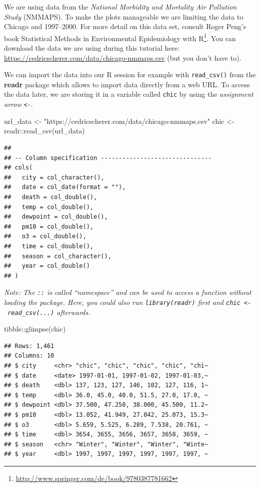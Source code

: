 \documentclass[
]{krantz}
\makeatletter
\newenvironment{Shaded}{\begin{snugshade}}{\end{snugshade}}
\newcommand{\FunctionTok}[1]{\textcolor[rgb]{0,0,0}{#1}}
\newcommand{\NormalTok}[1]{#1}
\newcommand{\OtherTok}[1]{\textcolor[rgb]{0.37,0.37,0.37}{#1}}
\newcommand{\SpecialCharTok}[1]{\textcolor[rgb]{0,0,0}{#1}}
\newcommand{\StringTok}[1]{\textcolor[rgb]{0.5,0.5,0.5}{#1}}
\renewcommand{\href}[2]{#2\footnote{\url{#1}}}
\newenvironment{kframe}{%
\medskip{}
\setlength{\fboxsep}{.8em}
 \def\at@end@of@kframe{}%
 \ifinner\ifhmode%
  \def\at@end@of@kframe{\end{minipage}}%
  \begin{minipage}{\columnwidth}%
 \fi\fi%
 \def\FrameCommand##1{\hskip\@totalleftmargin \hskip-\fboxsep
 \colorbox{shadecolor}{##1}\hskip-\fboxsep
     \hskip-\linewidth \hskip-\@totalleftmargin \hskip\columnwidth}%
 \MakeFramed {\advance\hsize-\width
   \@totalleftmargin\z@ \linewidth\hsize
   \@setminipage}}%
 {\par\unskip\endMakeFramed%
 \at@end@of@kframe}
\renewenvironment{Shaded}{\begin{kframe}}{\end{kframe}}
\makeatother
\begin{document}
We are using data from the \emph{National Morbidity and Mortality Air Pollution Study} (NMMAPS). To make the plots manageable we are limiting the data to Chicago and 1997--2000. For more detail on this data set, consult Roger Peng's book \href{http://www.springer.com/de/book/9780387781662}{Statistical Methods in Environmental Epidemiology with R}.
You can download the data we are using during this tutorial here: \url{https://cedricscherer.com/data/chicago-nmmaps.csv} (but you don't have to).

We can import the data into our R session for example with \texttt{read\_csv()} from the \textbf{readr} package which allows to import data directly from a web URL. To access the data later, we are storing it in a variable called \texttt{chic} by using the \emph{assignment arrow} \texttt{\textless{}-}.

\begin{Shaded}
\begin{Highlighting}[]
\NormalTok{url\_data }\OtherTok{\textless{}{-}} \StringTok{"https://cedricscherer.com/data/chicago{-}nmmaps.csv"}
\NormalTok{chic }\OtherTok{\textless{}{-}}\NormalTok{ readr}\SpecialCharTok{::}\FunctionTok{read\_csv}\NormalTok{(url\_data)}
\end{Highlighting}
\end{Shaded}

\begin{verbatim}
## 
## -- Column specification -------------------------------
## cols(
##   city = col_character(),
##   date = col_date(format = ""),
##   death = col_double(),
##   temp = col_double(),
##   dewpoint = col_double(),
##   pm10 = col_double(),
##   o3 = col_double(),
##   time = col_double(),
##   season = col_character(),
##   year = col_double()
## )
\end{verbatim}

\emph{Note: The \texttt{::} is called ``namespace'' and can be used to access a function without loading the package. Here, you could also run \texttt{library(readr)} first and \texttt{chic\ \textless{}-\ read\_csv(...)} afterwards.}

\begin{Shaded}
\begin{Highlighting}[]
\NormalTok{tibble}\SpecialCharTok{::}\FunctionTok{glimpse}\NormalTok{(chic)}
\end{Highlighting}
\end{Shaded}

\begin{verbatim}
## Rows: 1,461
## Columns: 10
## $ city     <chr> "chic", "chic", "chic", "chic", "chi~
## $ date     <date> 1997-01-01, 1997-01-02, 1997-01-03,~
## $ death    <dbl> 137, 123, 127, 146, 102, 127, 116, 1~
## $ temp     <dbl> 36.0, 45.0, 40.0, 51.5, 27.0, 17.0, ~
## $ dewpoint <dbl> 37.500, 47.250, 38.000, 45.500, 11.2~
## $ pm10     <dbl> 13.052, 41.949, 27.042, 25.073, 15.3~
## $ o3       <dbl> 5.659, 5.525, 6.289, 7.538, 20.761, ~
## $ time     <dbl> 3654, 3655, 3656, 3657, 3658, 3659, ~
## $ season   <chr> "Winter", "Winter", "Winter", "Winte~
## $ year     <dbl> 1997, 1997, 1997, 1997, 1997, 1997, ~
\end{verbatim}
\end{document}
